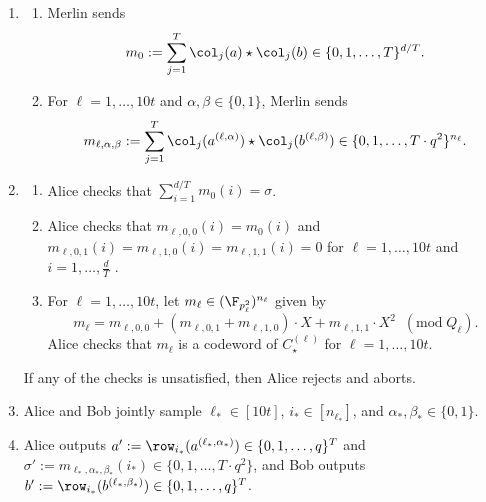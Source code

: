 \documentclass[11pt]{article}
\begin{document}
\begin{enumerate} 
\item \label{step:merlin}

\begin{enumerate}

\item \label{stp:merlin_1}

Merlin sends
$$m_0 := \sum_{j=1}^T  \col_j(a) \star \col_j(b) \in \{0,1,\ldots,T\}^{d/T}.$$

 \item For $\ell=1, \ldots, 10 t$ 
and $\alpha, \beta \in \{0,1\}$, Merlin sends
 $$m_{\ell,\alpha,\beta}:=\sum_{j=1}^T  \col_j(a^{(\ell,\alpha)}) \star \col_j(b^{(\ell,\beta)}) \in \{ 0,1, \ldots,T\cdot q^2\}^{n_\ell }.$$
 
 \end{enumerate}
 
 \item \label{step:alice_check}

\begin{enumerate}

\item \label{step:alice_check_sum} Alice checks that $\sum_{i=1}^{d/T} m_0(i) = \sigma$.


\item   \label{step:alice_check_con} Alice checks that $m_{\ell,0,0}(i) = m_0(i)$ and  $m_{\ell, 0,1} (i) =m_{\ell,1,0} (i) = m_{\ell,1,1} (i)=0$ for $\ell=1, \ldots, 10 t$ and  $i = 1, \ldots, \frac d T$ .

\item \label{step:alice_check_code}
For $\ell = 1, \ldots, 10 t$, let $m_\ell \in (\F_{p_\ell^2})^{n_\ell}$ given by 
$$  m_\ell = 
      m_{\ell,0,0}   + ( m_{\ell,0,1}   + m_{\ell,1,0} ) \cdot X +  m_{\ell,1,1}   \cdot X^2   \;\;(\mathrm{mod} \;Q_\ell).$$
      Alice checks that $m_\ell$ is a codeword of $C_\star^{(\ell)}$ for $\ell=1, \ldots, 10 t$.

 
 \end{enumerate}
 
 If any of the checks is unsatisfied, then Alice rejects and aborts.

\item \label{step:random} Alice and Bob jointly sample $\ell_* \in [10 t]$, $i_* \in[n_{\ell_*}]$, and $\alpha_*, \beta_* \in \{0,1\}$.

\item  \label{step:output}
Alice outputs $a' := \row_{i_*}(a^{(\ell_*,\alpha_*)}) \in \{0,1,\ldots,q\}^T$ and $\sigma' := m_{\ell_*,\alpha_*,\beta_*} (i_*)\in \{0,1,\ldots, T \cdot q^2\}$, and Bob outputs  $ b':=\row_{i_*}(b^{(\ell_*,\beta_*)}) \in \{0,1,\ldots,q\}^T$.
\end{enumerate}
\end{document}
